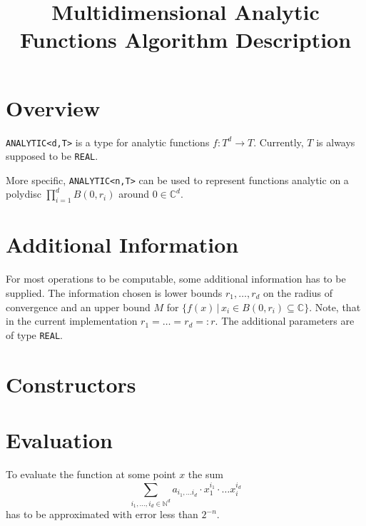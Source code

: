 \documentclass[]{article}
\title{Multidimensional Analytic Functions Algorithm Description}
\newcommand{\CC}{\mathbb C}
\newcommand{\NN}{\mathbb N}
\newcommand{\code}{\texttt}
\begin{document}
\section{Overview}
\code{ANALYTIC<d,T>} is a type for analytic functions $f: T^d \to T$.
Currently, $T$ is always supposed to be \code{REAL}.

More specific, \code{ANALYTIC<n,T>} can be used to represent functions analytic on a polydisc $\prod_{i=1}^d B(0, r_i)$ around $0 \in \CC^d$. 
\section{Additional Information}
For most operations to be computable, some additional information has to be supplied.
The information chosen is lower bounds $r_1, \dots, r_d$ on the radius of convergence and an upper bound $M$ for $\{f(x) \, | \, x_i \in B(0, r_i) \subseteq \CC \}$.  
Note, that in the current implementation $r_1 = \dots = r_d =: r$.
The additional parameters are of type \code{REAL}.
\section{Constructors}

\section{Evaluation}
To evaluate the function at some point $x$ the sum
$$ \sum_{i_1, \dots, i_d \in \NN^d} a_{i_1, \dots i_d} \cdot x_1^{i_1} \cdot \dots x_i^{i_d} $$
has to be approximated with error less than $2^{-n}$.
\end{document}
